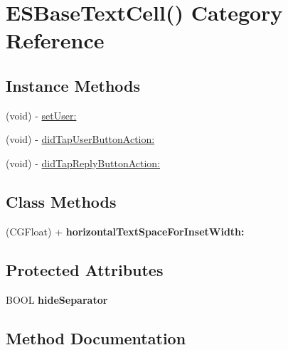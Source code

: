 \hypertarget{category_e_s_base_text_cell_07_08}{}\section{E\+S\+Base\+Text\+Cell() Category Reference}
\label{category_e_s_base_text_cell_07_08}
\subsection*{Instance Methods}
\begin{DoxyCompactItemize}
\item 
(void) -\/ \hyperlink{category_e_s_base_text_cell_07_08_aa8c67fd58c907cfc6621fef1c841a3d9}{set\+User\+:}
\item 
(void) -\/ \hyperlink{category_e_s_base_text_cell_07_08_a9e8c9598fab22db49a8ba93b9a9935ae}{did\+Tap\+User\+Button\+Action\+:}
\item 
(void) -\/ \hyperlink{category_e_s_base_text_cell_07_08_ad84a1b5dbf3a1ca8731a4c1868c3c2c2}{did\+Tap\+Reply\+Button\+Action\+:}
\end{DoxyCompactItemize}
\subsection*{Class Methods}
\begin{DoxyCompactItemize}
\item 
\hypertarget{category_e_s_base_text_cell_07_08_a4fa2c7406e48204bffff909d12b830d1}{}(C\+G\+Float) + {\bfseries horizontal\+Text\+Space\+For\+Inset\+Width\+:}\label{category_e_s_base_text_cell_07_08_a4fa2c7406e48204bffff909d12b830d1}

\end{DoxyCompactItemize}
\subsection*{Protected Attributes}
\begin{DoxyCompactItemize}
\item 
\hypertarget{category_e_s_base_text_cell_07_08_a6f89c18056bb7502cd0771e61c17940b}{}B\+O\+O\+L {\bfseries hide\+Separator}\label{category_e_s_base_text_cell_07_08_a6f89c18056bb7502cd0771e61c17940b}

\end{DoxyCompactItemize}


\subsection{Method Documentation}
\hypertarget{category_e_s_base_text_cell_07_08_ad84a1b5dbf3a1ca8731a4c1868c3c2c2}{}
